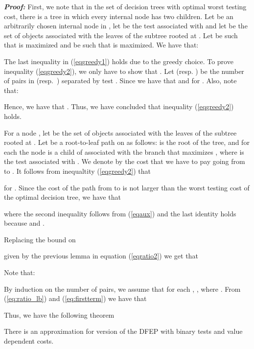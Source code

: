 \documentclass{llncs}
\begin{document}
\textit{\textbf{Proof:}} First, we note 
that in the set of decision trees with optimal worst testing cost, 
there is a tree  in which every internal node has two children. 
Let  be an arbitrarily chosen internal node in ,
let  be the test associated with  and let
 be the set of objects associated with the leaves of the subtree rooted at .
Let  be such that  is maximized and  be such that  
is maximized.
We have that:
	


The last inequality in (\ref{eqgreedy1}) holds due 
to the greedy choice. To prove inequality (\ref{eqgreedy2}),
we only have to show that .  
Let  (resp. ) be  
the number of  pairs 
in  (resp.\ ) separated by test .
Since   we have that  and
 for .
Also, note that:





Hence, we have that . Thus, we have concluded that 
inequality (\ref{eqgreedy2}) holds. 
	
For a node , let  be the set of objects
associated with the leaves of the subtree rooted at . 
Let  be a root-to-leaf path on  as follows:
 is the root of the tree, and for each  the node  is a child of 
  associated with the branch  that maximizes , where  is the test associated with .  
 We denote by  the cost that we have to pay going from  to .
It follows from inequaltity (\ref{eqgreedy2})
that  

for .
Since the cost of the  path from  to  is not larger than the worst testing cost of
the optimal decision tree,
we have that


where the second inequality follows from (\ref{eqaux})
and the last identity holds because  and .


Replacing the bound on 

given by the previous lemma in  equation (\ref{eqratio2}) we get that



Note that:



By induction on the number of  pairs,  we assume  that for each , , where 
. 
From (\ref{eq:ratio_lb}) and (\ref{eq:firstterm}) we have that


Thus,
we have the following theorem

\begin{theorem}
There is an  approximation for version of the DFEP with binary tests and  value dependent
costs.
\end{theorem}
\end{document}
